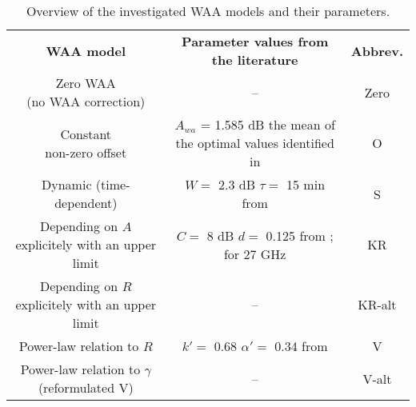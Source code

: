 \documentclass{ctuthesis}\usepackage[]{graphicx}\usepackage[]{color}
\begin{document}
\begin{table}[h]
\small
\begin{ctucolortab}
\centering
\begin{tabular}{ c  c  c  }
        \textbf{WAA model}   &  \textbf{Parameter values from the literature}   &  \textbf{Abbrev.}    \\
        \Midrule
        \makecell{Zero WAA \\ (no WAA correction)}  &  --   &   Zero 
        \\
        \makecell{Constant \\ non-zero offset}      &  \makecell{ $A_{wa}$ = 1.585 dB \\  the mean of the optimal  values \\ identified in \cite{overeemMeasuringUrbanRainfall2011}}   &   O 
        \\
        \makecell{Dynamic (time-dependent) \\ \citep{schleissQuantificationModelingWetAntenna2013} }    &  \makecell{$W =$ 2.3 dB \quad $\tau =$ 15 min \\  from \cite{schleissQuantificationModelingWetAntenna2013}}    &     S 
        \\
        \makecell{Depending on $A$ explicitely \\ with an upper limit \\ \citep{kharadlyEffectWetAntenna2001}}    &  \makecell{$C =$ 8 dB \quad  $d =$ 0.125 \\  from \cite{kharadlyEffectWetAntenna2001}; for 27 GHz}    &     KR 
        \\
        \makecell{Depending on $R$ explicitely \\ with an upper limit}   &  --   &  KR-alt 
        \\
        \makecell{Power-law relation to $R$ \\ \citep{valtrExcessAttenuationCaused2019}}    &  \makecell{$k' =$ 0.68 \quad $\alpha' =$ 0.34 \\  from \cite{valtrExcessAttenuationCaused2019}}    &     V 
        \\
        \makecell{Power-law relation to $\gamma$ \\ (reformulated V)}    &  --    &   V-alt
\end{tabular}
\caption{Overview of the investigated WAA models and their parameters.}
\label{table:II}
\end{ctucolortab}
\end{table}
\end{document}
